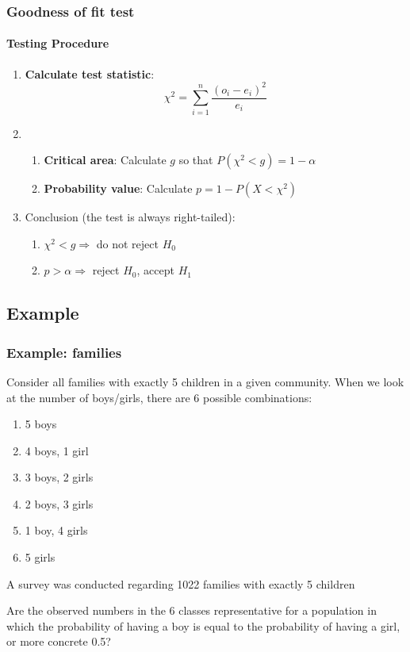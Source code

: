 \documentclass[aspectratio=169]{beamer}
\begin{document}
\begin{frame}
  \frametitle{Goodness of fit test}
  \framesubtitle{Testing Procedure}
  
  \begin{enumerate}
    \item \textbf{Calculate test statistic}:
    \[ \chi^{2} = \sum_{i=1}^{n} \frac{(o_{i} - e_{i})^{2}}{e_{i}} \]
    \item 
    \begin{enumerate}
      \item \textbf{Critical area}: Calculate $g$ so that $P(\chi^2 < g) = 1 - \alpha$
      \item \textbf{Probability value}: Calculate $p = 1 - P(X < \chi^2)$
    \end{enumerate}
    
    \item Conclusion (the test is always right-tailed):
    \begin{enumerate}
      \item $\chi^2 < g \Rightarrow$ do not reject $H_0$
      \item $p > \alpha \Rightarrow$ reject $H_0$, accept $H_1$
    \end{enumerate}
  \end{enumerate}
\end{frame}


\subsection{Example}

\begin{frame}
  \frametitle{Example: families}
  Consider all families with exactly 5 children in a given community.
  \pause
  When we look at the number of boys/girls, there are 6 possible combinations:
  \begin{enumerate}
    \item 5 boys
    \item 4 boys, 1 girl
    \item 3 boys, 2 girls
    \item 2 boys, 3 girls
    \item 1 boy, 4 girls
    \item 5 girls
  \end{enumerate}
  A survey was conducted regarding 1022 families with exactly 5 children
  \begin{center}
    Are the observed numbers in the 6 classes representative for a population in which the probability of having a boy is equal to the probability of having a girl, or more concrete 0.5?
  \end{center}
\end{frame}
\end{document}
